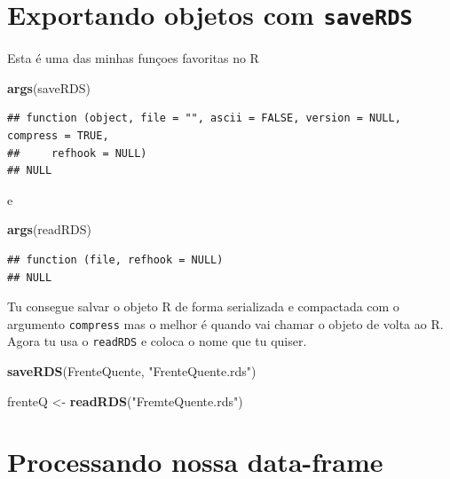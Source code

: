 \documentclass[]{book}
\newenvironment{Shaded}{\begin{snugshade}}{\end{snugshade}}
\newcommand{\KeywordTok}[1]{\textcolor[rgb]{0.13,0.29,0.53}{\textbf{#1}}}
\newcommand{\StringTok}[1]{\textcolor[rgb]{0.31,0.60,0.02}{#1}}
\newcommand{\NormalTok}[1]{#1}
\begin{document}
\section{\texorpdfstring{Exportando objetos com
\texttt{saveRDS}}{Exportando objetos com saveRDS}}\label{exportando-objetos-com-saverds}

Esta é uma das minhas funçoes favoritas no R

\begin{Shaded}
\begin{Highlighting}[]
\KeywordTok{args}\NormalTok{(saveRDS)}
\end{Highlighting}
\end{Shaded}

\begin{verbatim}
## function (object, file = "", ascii = FALSE, version = NULL, compress = TRUE, 
##     refhook = NULL) 
## NULL
\end{verbatim}

e

\begin{Shaded}
\begin{Highlighting}[]
\KeywordTok{args}\NormalTok{(readRDS)}
\end{Highlighting}
\end{Shaded}

\begin{verbatim}
## function (file, refhook = NULL) 
## NULL
\end{verbatim}

Tu consegue salvar o objeto R de forma serializada e compactada com o
argumento \texttt{compress} mas o melhor é quando vai chamar o objeto de
volta ao R. Agora tu usa o \texttt{readRDS} e coloca o nome que tu
quiser.

\begin{Shaded}
\begin{Highlighting}[]
\KeywordTok{saveRDS}\NormalTok{(FrenteQuente, }\StringTok{"FrenteQuente.rds"}\NormalTok{)}
\end{Highlighting}
\end{Shaded}

\begin{Shaded}
\begin{Highlighting}[]
\NormalTok{frenteQ <-}\StringTok{ }\KeywordTok{readRDS}\NormalTok{(}\StringTok{"FremteQuente.rds"}\NormalTok{)}
\end{Highlighting}
\end{Shaded}

\section{Processando nossa
data-frame}\label{processando-nossa-data-frame}
\end{document}
